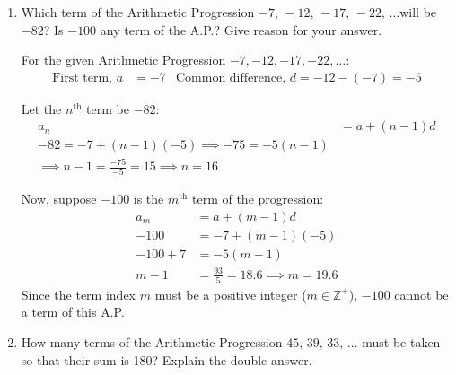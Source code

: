 \begin{enumerate}[label=\thesubsection.\arabic*, ref=\thesubsection.\theenumi]
	Factorising the quadratic equation:
	\begin{align*}
		x^2 + 25x - 20x - 500 &= 0 \implies (x - 20)(x + 25) = 0
	\end{align*}
	
	Equating each factor to zero:
	\begin{align*}
		x - 20 = 0 &\implies x = 20  & x + 25 = 0 \implies x = -25
	\end{align*}
	
	Since length cannot be negative, $x = 20\text{ m}$
	
	Evaluating the original rate per metre:
	\begin{align*}
		\text{Original rate} = \frac{200}{20} = 10\text{ Rs./m}
	\end{align*}
	
	
	
	\item Which term of the Arithmetic Progression $-7,\,-12,\,-17,\,-22,\,\ldots $will be $-82$? Is $-100$ any term of the A.P.? Give reason for your answer.
	
	\solution
	For the given Arithmetic Progression $-7, -12, -17, -22, \ldots$:
	\begin{align*}
		\text{First term, } a &= -7 & \text{Common difference, } d = -12 - (-7) = -5
	\end{align*}
	
	Let the $n^{\text{th}}$ term be $-82$:
	\begin{align*}
		a_n &= a + (n - 1)d \\
		-82 = -7 + (n - 1)(-5) \implies
		-75 = -5(n - 1) \\ 
		\implies n - 1 = \frac{-75}{-5} = 15 \implies
		n = 16
	\end{align*}
	
	Now, suppose $-100$ is the $m^{\text{th}}$ term of the progression:
	\begin{align*}
		a_m &= a + (m - 1)d \\
		-100 &= -7 + (m - 1)(-5) \\
		-100 + 7 &= -5(m - 1) \\
		m - 1 &= \frac{93}{5} = 18.6 \implies m = 19.6
	\end{align*}
	Since the term index $m$ must be a positive integer ($m \in \mathbb{Z}^+$), $-100$ cannot be a term of this A.P.
	
	
	\item How many terms of the Arithmetic Progression $45,\,39,\,33,\,\ldots$ must be taken so that their sum is 180? Explain the	double answer.
	

\end{enumerate}
